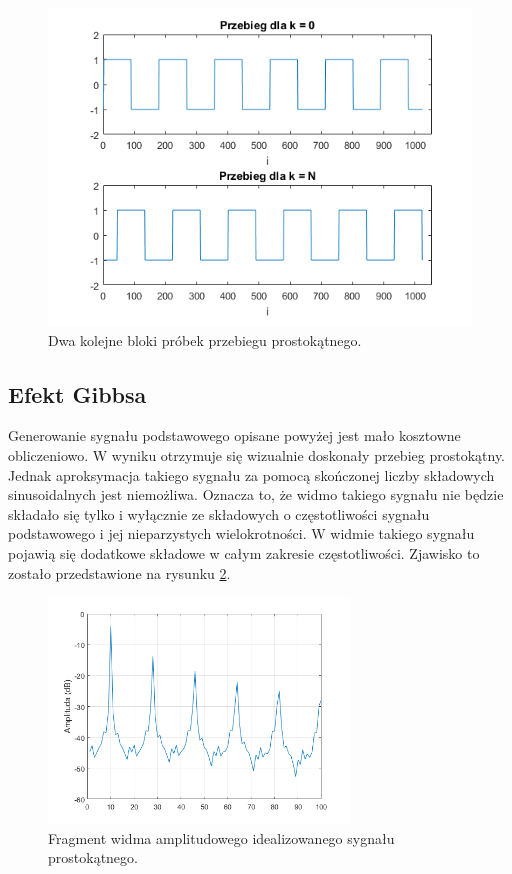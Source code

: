 \begin{figure}[H]
	\centering
	\includegraphics[width=12cm]{grafiki/sub_waveform_blocks}
	\captionsetup{justification=centering}
	\caption{Dwa kolejne bloki próbek przebiegu prostokątnego.}
	\label{rys:sub_waveform_blocks}
\end{figure}

\subsection{Efekt Gibbsa}
Generowanie sygnału podstawowego opisane powyżej jest mało kosztowne obliczeniowo. W wyniku otrzymuje się wizualnie doskonały przebieg prostokątny. Jednak aproksymacja takiego sygnału za pomocą skończonej liczby składowych sinusoidalnych jest niemożliwa. Oznacza to, że widmo takiego sygnału nie będzie składało się tylko i wyłącznie ze składowych o częstotliwości sygnału podstawowego i jej nieparzystych wielokrotności. W widmie takiego sygnału pojawią się dodatkowe składowe w całym zakresie częstotliwości. Zjawisko to zostało przedstawione na rysunku \ref{rys:sub_gibbs1}.
\begin{figure}[H]
	\centering
	\includegraphics[width=8cm]{grafiki/sub_gibbs1}
	\captionsetup{justification=centering}
	\caption{Fragment widma amplitudowego idealizowanego sygnału prostokątnego.}
	\label{rys:sub_gibbs1}
\end{figure}

